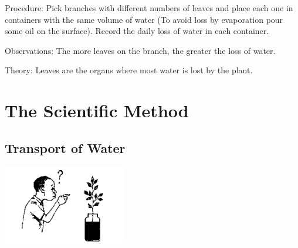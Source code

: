 \begin{multicols}{2}
\begin{description*}
\item[Procedure:]{Pick branches with different numbers of leaves and place each one in containers with the
same volume of water (To avoid loss by evaporation pour some oil on the surface). Record
the daily loss of water in each container.}
\item[Observations:]{The more leaves on the branch, the greater the loss of water.}
\item[Theory:]{Leaves are the organs where most water is lost by the plant.}
\end{description*}


\section*{The Scientific Method}


\subsection{Transport of Water} %

\begin{center}
\includegraphics[width=0.4\textwidth]{./img/source/sci-meth-ink-plant.png}
\end{center}


\end{multicols}
